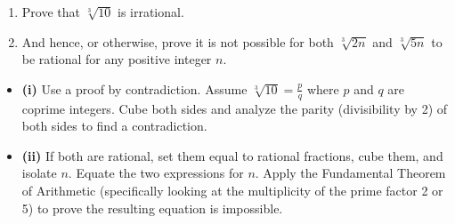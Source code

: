 
\begin{problem}
\begin{enumerate}[label=(\roman*)]
    \item Prove that $\sqrt[3]{10}$ is irrational.
    \item And hence, or otherwise, prove it is not possible for both $\sqrt[3]{2n}$ and $\sqrt[3]{5n}$ to be rational for any positive integer $n$.
\end{enumerate}
\end{problem}

\begin{hint}
\begin{itemize}
    \item \textbf{(i)} Use a proof by contradiction. Assume $\sqrt[3]{10} = \frac{p}{q}$ where $p$ and $q$ are coprime integers. Cube both sides and analyze the parity (divisibility by 2) of both sides to find a contradiction.
    \item \textbf{(ii)} If both are rational, set them equal to rational fractions, cube them, and isolate $n$. Equate the two expressions for $n$. Apply the Fundamental Theorem of Arithmetic (specifically looking at the multiplicity of the prime factor 2 or 5) to prove the resulting equation is impossible.
\end{itemize}
\end{hint}

